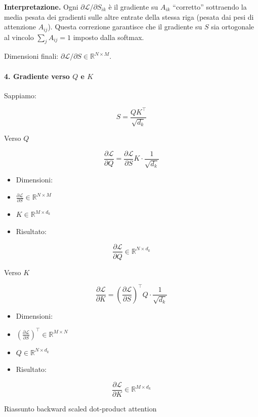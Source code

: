 \documentclass[
  11pt,
]{article}
\begin{document}
\textbf{Interpretazione.} Ogni $\partial\mathcal{L}/\partial S_{ik}$ è il gradiente su $A_{ik}$ ``corretto'' sottraendo la media pesata dei gradienti sulle altre entrate della stessa riga (pesata dai pesi di attenzione $A_{ij}$). Questa correzione garantisce che il gradiente su $S$ sia ortogonale al vincolo $\sum_j A_{ij} = 1$ imposto dalla softmax.

Dimensioni finali: $\partial \mathcal{L}/\partial S \in \mathbb{R}^{N \times M}$.

\paragraph{4. Gradiente verso $Q$ e $K$}


Sappiamo:

\[S = \frac{QK^{\top}}{\sqrt{d_{k}}}\]

Verso \(Q\)

\[\frac{\partial\mathcal{L}}{\partial Q} = \frac{\partial\mathcal{L}}{\partial S}K \cdot \frac{1}{\sqrt{d_{k}}}\]


\begin{itemize}
\item
  Dimensioni:
\item
  \(\frac{\partial\mathcal{L}}{\partial S} \in \mathbb{R}^{N \times M}\)
\item
  \(K \in \mathbb{R}^{M \times d_{k}}\)
\item
  Risultato:
\end{itemize}

\[\frac{\partial\mathcal{L}}{\partial Q} \in \mathbb{R}^{N \times d_{k}}\]


Verso \(K\)

\[\frac{\partial\mathcal{L}}{\partial K} = \left( \frac{\partial\mathcal{L}}{\partial S} \right)^{\top}Q \cdot \frac{1}{\sqrt{d_{k}}}\]


\begin{itemize}
\item
  Dimensioni:
\item
  \(\left( \frac{\partial\mathcal{L}}{\partial S} \right)^{\top} \in \mathbb{R}^{M \times N}\)
\item
  \(Q \in \mathbb{R}^{N \times d_{k}}\)
\item
  Risultato:
\end{itemize}


\[\frac{\partial\mathcal{L}}{\partial K} \in \mathbb{R}^{M \times d_{k}}\]


Riassunto backward scaled dot-product attention
\end{document}
